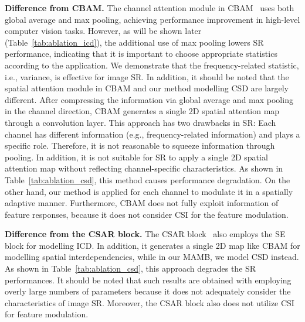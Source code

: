 \documentclass[final,5p,times,twocolumn]{elsarticle}
\begin{document}
\textbf{Difference from CBAM.}
The channel attention module in CBAM~\cite{woo2018cbam} uses both global average and max pooling, achieving performance improvement in high-level computer vision tasks. 
However, as will be shown later (Table~\ref{tab:ablation_icd}), the additional use of max pooling lowers SR performance, indicating that it is important to choose appropriate statistics according to the application.
We demonstrate that the frequency-related statistic, i.e., variance, is effective for image SR.
In addition, it should be noted that the spatial attention module in CBAM and our method modelling CSD are largely different.
After compressing the information via global average and max pooling in the channel direction, CBAM generates a single 2D spatial attention map through a convolution layer.
This approach has two drawbacks in SR:
Each channel has different information (e.g., frequency-related information) and plays a specific role. 
Therefore, it is not reasonable to squeeze information through pooling. 
In addition, it is not suitable for SR to apply a single 2D spatial attention map without reflecting channel-specific characteristics. 
As shown in Table~\ref{tab:ablation_csd}, this method causes performance degradation.
On the other hand, our method is applied for each channel to modulate it in a spatially adaptive manner.
Furthermore, CBAM does not fully exploit information of feature responses, because it does not consider CSI for the feature modulation.

\textbf{Difference from the CSAR block.}
The CSAR block~\cite{hu2018channel} also employs the SE block for modelling ICD.
In addition, it generates a single 2D map like CBAM for modelling spatial interdependencies, while in our MAMB, we model CSD instead.
As shown in Table~\ref{tab:ablation_csd}, this approach degrades the SR performances.
It should be noted that such results are obtained with employing overly large numbers of parameters because it does not adequately consider the characteristics of image SR.
Moreover, the CSAR block also does not utilize CSI for feature modulation.  
\end{document}
